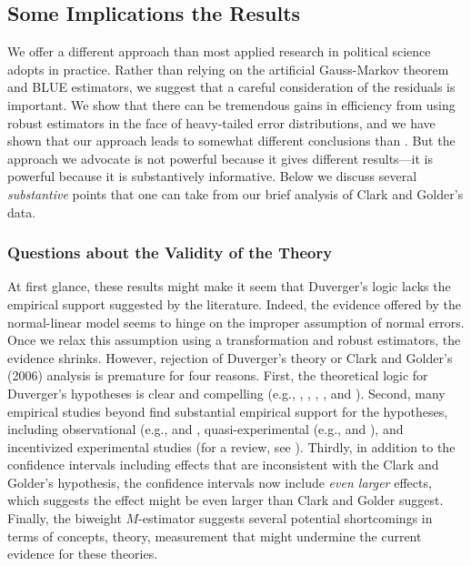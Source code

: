 \documentclass[12pt]{article}
\begin{document}
\subsection*{Some Implications the Results}

We offer a different approach than most applied research in political science adopts in practice. 
Rather than relying on the artificial Gauss-Markov theorem and BLUE estimators, we suggest that a careful consideration of the residuals is important. 
We show that there can be tremendous gains in efficiency from using robust estimators in the face of heavy-tailed error distributions, and we have shown that our approach leads to somewhat different conclusions than \cite{ClarkGolder2006}. 
But the approach we advocate is not powerful because it gives different results---it is powerful because it is substantively informative. 
Below we discuss several \textit{substantive} points that one can take from our brief analysis of Clark and Golder's data.

\subsubsection*{Questions about the Validity of the Theory}

At first glance, these results might make it seem that Duverger's logic lacks the empirical support suggested by the literature. Indeed, the evidence offered by the normal-linear model seems to hinge on the improper assumption of normal errors. 
Once we relax this assumption using a transformation and robust estimators, the evidence shrinks. However, rejection of Duverger's theory or Clark and Golder's (2006) analysis is premature for four reasons. 
First, the theoretical logic for Duverger's hypotheses is clear and compelling (e.g., \citealt{Duverger1963}, \citealt{Riker1982}, \citealt{Cox1997}, \citealt{AmorimNetoCox1997}, and \citealt{Cox1999}). 
Second, many empirical studies beyond \cite{ClarkGolder2006} find substantial empirical support for the hypotheses, including observational (e.g., \citealt{ChhibberKollman1998} and \citealt{SingerStephenson2009}, quasi-experimental (e.g., \citealt{Blaisetal2011} and \citealt{Fujiwara2011}), and incentivized experimental studies (for a review, see \citealt{Rietz2008}). 
Thirdly, in addition to the confidence intervals including effects that are inconsistent with the Clark and Golder's hypothesis, the confidence intervals now include \textit{even larger} effects, which suggests the effect might be even larger than Clark and Golder suggest.
Finally, the biweight $M$-estimator suggests several potential shortcomings in terms of concepts, theory, measurement that might undermine the current evidence for these theories.
\end{document}
